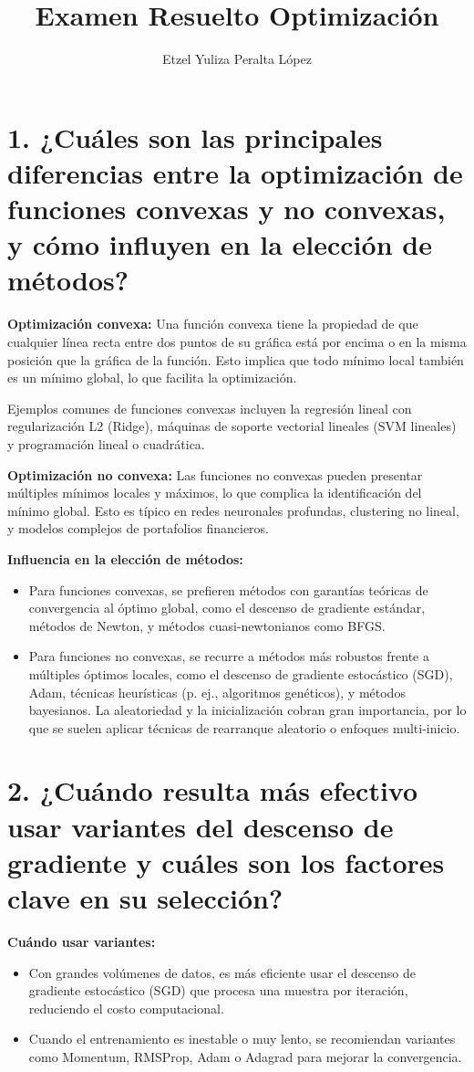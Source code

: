 \documentclass[a4paper,12pt]{article}
\title{Examen Resuelto Optimización}
\author{Etzel Yuliza Peralta López}
\date{}
\begin{document}
	
	\maketitle
	
	\section*{1. ¿Cuáles son las principales diferencias entre la optimización de funciones convexas y no convexas, y cómo influyen en la elección de métodos?}
	\textbf{Optimización convexa:} Una función convexa tiene la propiedad de que cualquier línea recta entre dos puntos de su gráfica está por encima o en la misma posición que la gráfica de la función. Esto implica que todo mínimo local también es un mínimo global, lo que facilita la optimización.
	
	Ejemplos comunes de funciones convexas incluyen la regresión lineal con regularización L2 (Ridge), máquinas de soporte vectorial lineales (SVM lineales) y programación lineal o cuadrática.
	
	\textbf{Optimización no convexa:} Las funciones no convexas pueden presentar múltiples mínimos locales y máximos, lo que complica la identificación del mínimo global. Esto es típico en redes neuronales profundas, clustering no lineal, y modelos complejos de portafolios financieros.
	
	\textbf{Influencia en la elección de métodos:} 
	\begin{itemize}
		\item Para funciones convexas, se prefieren métodos con garantías teóricas de convergencia al óptimo global, como el descenso de gradiente estándar, métodos de Newton, y métodos cuasi-newtonianos como BFGS.
		\item Para funciones no convexas, se recurre a métodos más robustos frente a múltiples óptimos locales, como el descenso de gradiente estocástico (SGD), Adam, técnicas heurísticas (p. ej., algoritmos genéticos), y métodos bayesianos. La aleatoriedad y la inicialización cobran gran importancia, por lo que se suelen aplicar técnicas de rearranque aleatorio o enfoques multi-inicio.
	\end{itemize}
	
	\section*{2. ¿Cuándo resulta más efectivo usar variantes del descenso de gradiente y cuáles son los factores clave en su selección?}
	\textbf{Cuándo usar variantes:}
	\begin{itemize}
		\item Con grandes volúmenes de datos, es más eficiente usar el descenso de gradiente estocástico (SGD) que procesa una muestra por iteración, reduciendo el costo computacional.
		\item Cuando el entrenamiento es inestable o muy lento, se recomiendan variantes como Momentum, RMSProp, Adam o Adagrad para mejorar la convergencia.
	\end{itemize}
	
\end{document}
